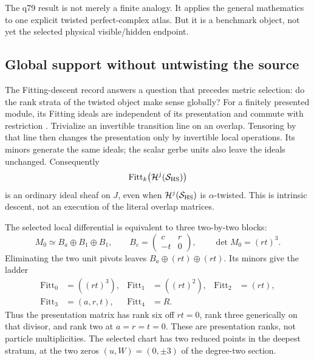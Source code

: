 \documentclass[11pt,a4paper]{article}
\newcommand{\HS}{\mathrm{HS}}
\begin{document}
The q79 result is not merely a finite analogy.  It applies the general
mathematics to one explicit twisted perfect-complex atlas.  But it is a
benchmark object, not yet the selected physical visible/hidden endpoint.

\subsection{Global support without untwisting the source}
\label{sec:q79-fitting-descent}

The Fitting-descent record \cite{Q79FittingDescent2026} answers a question
that precedes metric selection: do the rank strata of the twisted object
make sense globally? For a finitely presented module, its Fitting ideals
are independent of its presentation and commute with restriction
\cite{StacksFitting}. Trivialize an invertible transition line on an overlap.
Tensoring by that line then changes the presentation only by invertible
local operations. Its minors generate the same ideals; the scalar gerbe
units also leave the ideals unchanged. Consequently
\[
\operatorname{Fitt}_k\bigl(\mathcal H^j(\calS_{\HS})\bigr)
\]
is an ordinary ideal sheaf on \(J\), even when
\(\mathcal H^j(\calS_{\HS})\) is \(\alpha\)-twisted. This is intrinsic
descent, not an execution of the literal overlap matrices.

The selected local differential is equivalent to three two-by-two blocks:
\begin{equation}
 M_0\simeq B_a\oplus B_1\oplus B_1,\qquad
 B_c=\begin{pmatrix}c&r\\-t&0\end{pmatrix},
 \qquad \det M_0=(rt)^3 .
 \tag{Q1}\label{eq:q79-fitting-blocks}
\end{equation}
Eliminating the two unit pivots leaves
\(B_a\oplus(rt)\oplus(rt)\). Its minors give the ladder
\begin{equation}
\begin{aligned}
 \operatorname{Fitt}_0&=((rt)^3),&
 \operatorname{Fitt}_1&=((rt)^2),&
 \operatorname{Fitt}_2&=(rt),\\
 \operatorname{Fitt}_3&=(a,r,t),&
 \operatorname{Fitt}_4&=R .
\end{aligned}
\tag{Q2}\label{eq:q79-fitting-ladder}
\end{equation}
Thus the presentation matrix has rank six off \(rt=0\), rank three
generically on that divisor, and rank two at \(a=r=t=0\).
These are presentation ranks, not particle multiplicities. The selected
chart has two reduced points in the deepest stratum, at the two zeros
\((u,W)=(0,\pm3)\) of the degree-two section.
\end{document}
